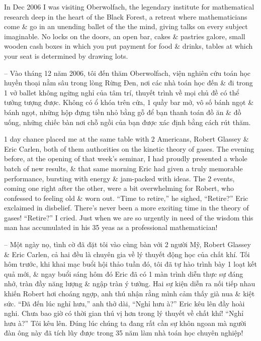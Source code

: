 \documentclass{article}
\begin{document}
\begin{enumerate}
	In Dec 2006 I was visiting Oberwolfach, the legendary institute for mathematical research deep in the heart of the Black Forest, a retreat where mathematicians come \& go in an unending ballet of the the mind, giving talks on every subject imaginable. No locks on the doors, an open bar, cakes \& pastries galore, small wooden cash boxes in which you put payment for food \& drinks, tables at which your seat is determined by drawing lots.

	-- Vào tháng 12 năm 2006, tôi đến thăm Oberwolfach, viện nghiên cứu toán học huyền thoại nằm sâu trong lòng Rừng Đen, nơi các nhà toán học đến \& đi trong 1 vở ballet không ngừng nghỉ của tâm trí, thuyết trình về mọi chủ đề có thể tưởng tượng được. Không có ổ khóa trên cửa, 1 quầy bar mở, vô số bánh ngọt \& bánh ngọt, những hộp đựng tiền nhỏ bằng gỗ để bạn thanh toán đồ ăn \& đồ uống, những chiếc bàn nơi chỗ ngồi của bạn được xác định bằng cách rút thăm.

	1 day chance placed me at the same table with 2 Americans, {\sc Robert Glassey \& Eric Carlen}, both of them authorities on the kinetic theory of gases. The evening before, at the opening of that week's seminar, I had proudly presented a whole batch of new results, \& that same morning Eric had given a truly memorable performance, bursting with energy \& jam-packed with ideas. The 2 events, coming one right after the other, were a bit overwhelming for Robert, who confessed to feeling old \& worn out. ``Time to retire,'' he sighed, ``Retire?'' Eric exclaimed in disbelief. There's never been a more exciting time in the theory of gases! ``Retire?'' I cried. Just when we are so urgently in need of the wisdom this man has accumulated in his 35 yeas as a professional mathematician!

	-- Một ngày nọ, tình cờ đã đặt tôi vào cùng bàn với 2 người Mỹ, {\sc Robert Glassey \& Eric Carlen}, cả hai đều là chuyên gia về lý thuyết động học của chất khí. Tối hôm trước, khi khai mạc buổi hội thảo tuần đó, tôi đã tự hào trình bày 1 loạt kết quả mới, \& ngay buổi sáng hôm đó Eric đã có 1 màn trình diễn thực sự đáng nhớ, tràn đầy năng lượng \& ngập tràn ý tưởng. Hai sự kiện diễn ra nối tiếp nhau khiến Robert hơi choáng ngợp, anh thú nhận rằng mình cảm thấy già nua \& kiệt sức. ``Đã đến lúc nghỉ hưu,'' anh thở dài, ``Nghỉ hưu à?'' Eric kêu lên đầy hoài nghi. Chưa bao giờ có thời gian thú vị hơn trong lý thuyết về chất khí! ``Nghỉ hưu à?'' Tôi kêu lên. Đúng lúc chúng ta đang rất cần sự khôn ngoan mà người đàn ông này đã tích lũy được trong 35 năm làm nhà toán học chuyên nghiệp!


\end{enumerate}
\end{document}
